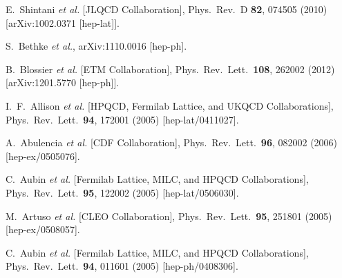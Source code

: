 \begin{thebibliography}{99}
  E.~Shintani {\it et al.} [JLQCD Collaboration],
  Phys.\ Rev.\ D {\bf 82}, 074505 (2010)
  [arXiv:1002.0371 [hep-lat]].
  
  S.~Bethke {\it et al.},
  arXiv:1110.0016 [hep-ph].
  
  B.~Blossier {\it et al.} [ETM Collaboration],
  Phys.\ Rev.\ Lett.\  {\bf 108}, 262002 (2012)
  [arXiv:1201.5770 [hep-ph]].
  
  I.~F.~Allison {\it et al.}  [HPQCD, Fermilab Lattice, and UKQCD Collaborations],
  Phys.\ Rev.\ Lett.\  {\bf 94}, 172001 (2005)
  [hep-lat/0411027].
  
  A.~Abulencia {\it et al.}  [CDF Collaboration],
  Phys.\ Rev.\ Lett.\  {\bf 96}, 082002 (2006)
  [hep-ex/0505076].
  
  C.~Aubin {\it et al.} [Fermilab Lattice, MILC, and HPQCD Collaborations],
  Phys.\ Rev.\ Lett.\  {\bf 95}, 122002 (2005)
  [hep-lat/0506030].
  
  M.~Artuso {\it et al.}  [CLEO Collaboration],
  Phys.\ Rev.\ Lett.\  {\bf 95}, 251801 (2005)
  [hep-ex/0508057].
  
  C.~Aubin {\it et al.}  [Fermilab Lattice, MILC, and HPQCD Collaborations],
  Phys.\ Rev.\ Lett.\  {\bf 94}, 011601 (2005)
  [hep-ph/0408306].
  

\end{thebibliography}
